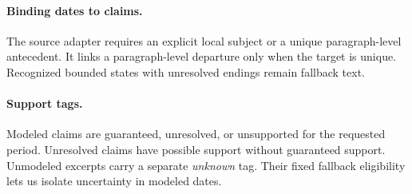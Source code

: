 \paragraph{Binding dates to claims.}
The source adapter requires an explicit local subject or a unique paragraph-level antecedent.
It links a paragraph-level departure only when the target is unique.
Recognized bounded states with unresolved endings remain fallback text.

\paragraph{Support tags.}
Modeled claims are guaranteed, unresolved, or unsupported for the requested period.
Unresolved claims have possible support without guaranteed support.
Unmodeled excerpts carry a separate \emph{unknown} tag.
Their fixed fallback eligibility lets us isolate uncertainty in modeled dates.

